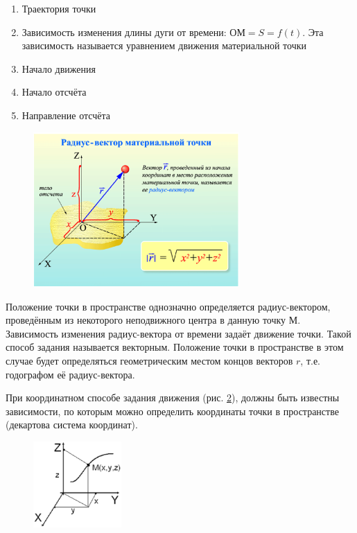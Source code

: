 \documentclass[a6paper, 11pt]{diss_4}
\renewcommand{\'}{\,'}
\begin{document}
\begin{enumerate}
  \item Траектория точки
  \item Зависимость изменения длины дуги от времени: $ОМ=S=f(t)$. Эта зависимость называется уравнением движения материальной точки
  \item Начало движения
  \item Начало отсчёта
  \item Направление отсчёта
\end{enumerate}

\begin{figure}[h]
\begin{center}
\includegraphics*[width=0.7\textwidth]{img/img02.eps}
\label{fig1}
\end{center}\end{figure}

  Положение точки в пространстве однозначно определяется радиус-вектором,
проведённым из некоторого неподвижного центра в данную точку $М$. Зависимость
изменения радиус-вектора от времени задаёт движение точки. Такой способ задания
называется векторным. Положение точки в пространстве в этом случае будет
определяться геометрическим местом концов векторов $r$, т.е. годографом её
радиус-вектора.

  При координатном способе задания движения (рис. \ref{fig5}), должны быть известны
зависимости, по которым можно определить координаты точки в пространстве
(декартова система координат).
\begin{figure}
\includegraphics[width=0.3\textwidth]{img/img05.eps}
\caption{}
\label{fig5}
\end{figure}
\end{document}
